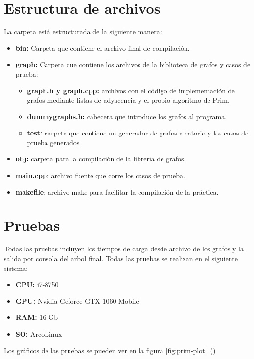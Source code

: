 \section{Estructura de archivos}
La carpeta está estructurada de la siguiente manera:
\begin{itemize}
    \item\textbf{bin:} Carpeta que contiene el archivo final de compilación.
    \item\textbf{graph:} Carpeta que contiene los archivos de la biblioteca de grafos y casos de prueba:
    \begin{itemize}
       \item\textbf{graph.h y graph.cpp:} archivos con el código de implementación de grafos mediante listas de adyacencia y el propio algoritmo de Prim.
       \item\textbf{dummygraphs.h:} cabecera que introduce los grafos al programa.
       \item\textbf{test:} carpeta que contiene un generador de grafos aleatorio y los casos de prueba generados
    \end{itemize}
    \item\textbf{obj:} carpeta para la compilación de la librería de grafos.
    \item\textbf{main.cpp}: archivo fuente que corre los casos de prueba.
    \item\textbf{makefile}: archivo make para facilitar la compilación de la práctica.
\end{itemize}

\section{Pruebas}
Todas las pruebas incluyen los tiempos de carga desde archivo de los grafos y la salida por consola del arbol final. Todas las pruebas se realizan en el siguiente sistema:
\begin{itemize}
    \item\textbf{CPU:} i7-8750
    \item\textbf{GPU:} Nvidia Geforce GTX 1060 Mobile
    \item\textbf{RAM:} 16 Gb
    \item\textbf{SO:} ArcoLinux
\end{itemize}



Los gráficos de las pruebas se pueden ver en la figura \ref{fig:prim-plot}~()

